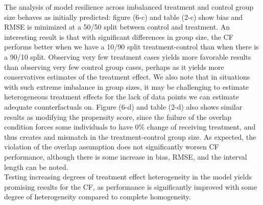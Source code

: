 \documentclass[12pt]{article}
\begin{document}
The analysis of model resilience across imbalanced treatment and control group size behaves as initially predicted: figure (6-c) and table (2-c) show bias and RMSE is minimized at a 50/50 split between control and treatment. An interesting result is that with significant differences in group size, the CF performs better when we have a 10/90 split treatment-control than when there is a 90/10 split. Observing very few treatment cases yields more favorable results than observing very few control group cases, perhaps as it yields more conservatives estimates of the treatment effect. We also note that in situations with such extreme imbalance in group sizes, it may be challenging to estimate heterogeneous treatment effects for the lack of data points we can estimate adequate counterfactuals on. Figure (6-d) and table (2-d) also shows similar results as modifying the propensity score, since the failure of the overlap condition forces some individuals to have 0\% change of receiving treatment, and thus creates and mismatch in the treatment-control group size. As expected, the violation of the overlap assumption does not significantly worsen CF performance, although there is some increase in bias, RMSE, and the interval length can be noted. \\ 

Testing increasing degrees of treatment effect heterogeneity in the model yields promising results for the CF, as performance is significantly improved with some degree of heterogeneity compared to complete homogeneity. 
\end{document}
